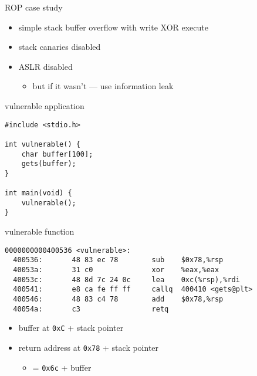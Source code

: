 \usetikzlibrary{arrows.meta,shapes.multipart,positioning}

\begin{frame}{ROP case study}
    \begin{itemize}
    \item simple stack buffer overflow with write XOR execute
    \item stack canaries disabled
    \item ASLR disabled
        \begin{itemize}
        \item but if it wasn't --- use information leak
        \end{itemize}
    \end{itemize}
\end{frame}

\begin{frame}[fragile,label=vuln]{vulnerable application}
    \lstset{language=C,style=small}
\begin{lstlisting}
#include <stdio.h>

int vulnerable() {
    char buffer[100];
    gets(buffer);
}

int main(void) {
    vulnerable();
}
\end{lstlisting}
\end{frame}

\begin{frame}[fragile,label=vulnFunc]{vulnerable function}
    \lstset{language=myasm,style=small}
\begin{lstlisting}
0000000000400536 <vulnerable>:
  400536:       48 83 ec 78        sub    $0x78,%rsp
  40053a:       31 c0              xor    %eax,%eax
  40053c:       48 8d 7c 24 0c     lea    0xc(%rsp),%rdi
  400541:       e8 ca fe ff ff     callq  400410 <gets@plt>
  400546:       48 83 c4 78        add    $0x78,%rsp
  40054a:       c3                 retq   
\end{lstlisting}
    \begin{itemize}
        \item<2> buffer at \texttt{0xC} + stack pointer
        \item<2> return address at \texttt{0x78} + stack pointer
            \begin{itemize}
                \item = \texttt{0x6c} + buffer
            \end{itemize}
    \end{itemize}
\end{frame}

